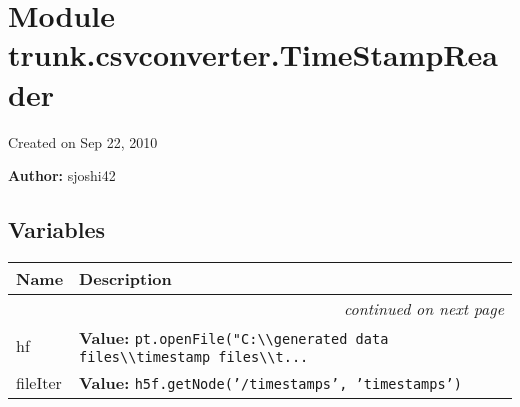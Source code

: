 %
%
%


\section{Module trunk.csvconverter.TimeStampReader}

    \label{trunk:csvconverter:TimeStampReader}
Created on Sep 22, 2010

\textbf{Author:} sjoshi42





  \subsection{Variables}

    \vspace{-1cm}
\hspace{\varindent}\begin{longtable}{|p{\varnamewidth}|p{\vardescrwidth}|l}
\cline{1-2}
\cline{1-2} \centering \textbf{Name} & \centering \textbf{Description}& \\
\cline{1-2}
\endhead\cline{1-2}\multicolumn{3}{r}{\small\textit{continued on next page}}\\\endfoot\cline{1-2}
\endlastfoot\raggedright h\-5\-f\- & \raggedright \textbf{Value:} 
{\tt pt.openFile("C:{\textbackslash}{\textbackslash}generated data files{\textbackslash}{\textbackslash}timestamp files{\textbackslash}{\textbackslash}t\texttt{...}}&\\
\cline{1-2}
\raggedright f\-i\-l\-e\-I\-t\-e\-r\- & \raggedright \textbf{Value:} 
{\tt h5f.getNode('/timestamps', 'timestamps')}&\\
\cline{1-2}
\end{longtable}


